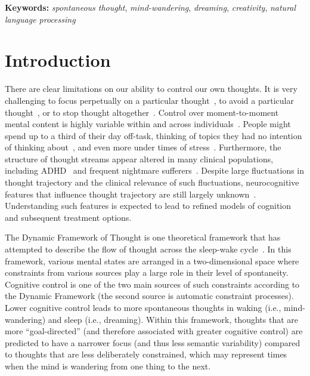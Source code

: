 \documentclass[10pt,a4paper,twocolumn]{article}
\begin{document}
\textbf{Keywords:} \textit{spontaneous thought}, \textit{mind-wandering}, \textit{dreaming}, \textit{creativity}, \textit{natural language processing}



\section*{Introduction}

There are clear limitations on our ability to control our own thoughts. It is very challenging to focus perpetually on a particular thought~\cite{pashler2001}, to avoid a particular thought~\cite{abramowitz2001}, or to stop thought altogether~\cite{woods2024}. Control over moment-to-moment mental content is highly variable within and across individuals~\cite{feliu-soler2019}. People might spend up to a third of their day off-task, thinking of topics they had no intention of thinking about~\cite{kane2007}, and even more under times of stress~\cite{smallwood2009}. Furthermore, the structure of thought streams appear altered in many clinical populations, including ADHD~\cite{alperin2021,vandendriessche2017} and frequent nightmare sufferers~\cite{carr2016}. Despite large fluctuations in thought trajectory and the clinical relevance of such fluctuations, neurocognitive features that influence thought trajectory are still largely unknown~\cite{mildner2019}. Understanding such features is expected to lead to refined models of cognition and subsequent treatment options.

\par
The Dynamic Framework of Thought is one theoretical framework that has attempted to describe the flow of thought across the sleep-wake cycle~\cite{christoff2016}. In this framework, various mental states are arranged in a two-dimensional space where constraints from various sources play a large role in their level of spontaneity. Cognitive control is one of the two main sources of such constraints according to the Dynamic Framework (the second source is automatic constraint processes). Lower cognitive control leads to more spontaneous thoughts in waking (i.e., mind-wandering) and sleep (i.e., dreaming). Within this framework, thoughts that are more ``goal-directed'' (and therefore associated with greater cognitive control) are predicted to have a narrower focus (and thus less semantic variability) compared to thoughts that are less deliberately constrained, which may represent times when the mind is wandering from one thing to the next.
\end{document}
